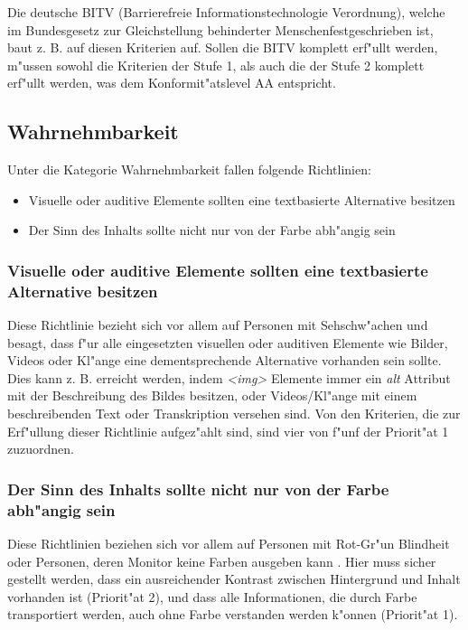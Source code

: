 \documentclass[a4paper,bibtotoc,oneside]{scrbook}
\begin{document}
Die deutsche BITV (Barrierefreie Informationstechnologie Verordnung), welche im \glqq Bundesgesetz zur Gleichstellung behinderter Menschen\grqq  festgeschrieben ist, baut z. B. auf diesen Kriterien auf. Sollen die BITV komplett erf"ullt werden, m"ussen sowohl die Kriterien der Stufe 1, als auch die der Stufe 2 komplett erf"ullt werden, was dem Konformit"atslevel AA entspricht. \cite[S. 38-39]{barr_webd}

\subsection{Wahrnehmbarkeit}
Unter die Kategorie Wahrnehmbarkeit fallen folgende Richtlinien: 

\begin{itemize}
\item Visuelle oder auditive Elemente sollten eine textbasierte Alternative besitzen\cite[Abschnitt 6.1]{wcag1}
\item Der Sinn des Inhalts sollte nicht nur von der Farbe abh"angig sein \cite[Abschnitt 6.2]{wcag1}
\end{itemize}

\subsubsection{Visuelle oder auditive Elemente sollten eine textbasierte Alternative besitzen}
Diese Richtlinie bezieht sich vor allem auf Personen mit Sehschw"achen und besagt, dass f"ur alle eingesetzten visuellen oder auditiven Elemente wie Bilder, Videos oder Kl"ange eine dementsprechende Alternative vorhanden sein sollte. Dies kann z. B. erreicht werden, indem \emph{<img>} Elemente immer ein \emph{alt} Attribut mit der Beschreibung des Bildes besitzen, oder Videos/Kl"ange mit einem beschreibenden Text oder Transkription versehen sind. Von den Kriterien, die  zur Erf"ullung dieser Richtlinie aufgez"ahlt sind, sind vier von f"unf der Priorit"at 1 zuzuordnen. \cite[Abschnitt 6.1]{wcag1}

\subsubsection{Der Sinn des Inhalts sollte nicht nur von der Farbe abh"angig sein}
Diese Richtlinien beziehen sich vor allem auf Personen mit Rot-Gr"un Blindheit oder Personen, deren Monitor keine Farben ausgeben kann \cite[S. 41]{barr_webd}. Hier muss sicher gestellt werden, dass ein ausreichender Kontrast zwischen Hintergrund und Inhalt vorhanden ist (Priorit"at 2), und dass alle Informationen, die durch Farbe transportiert werden, auch ohne Farbe verstanden werden k"onnen (Priorit"at 1). \cite[Abschnitt 6.1]{wcag1}
\end{document}

